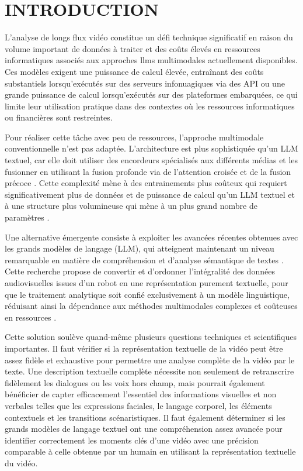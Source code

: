 \chapter{INTRODUCTION}

L’analyse de longs flux vidéo constitue un défi technique significatif en raison du volume important de données à traiter et des coûts élevés en ressources informatiques associés aux approches llms multimodales actuellement disponibles. Ces modèles exigent une puissance de calcul élevée, entraînant des coûts substantiels lorsqu’exécutés sur des serveurs infonuagiques via des API ou une grande puissance de calcul lorsqu’exécutés sur des plateformes embarquées, ce qui limite leur utilisation pratique dans des contextes où les ressources informatiques ou financières sont restreintes. 

Pour réaliser cette tâche avec peu de ressources, l'approche multimodale conventionnelle n’est pas adaptée. L’architecture est plus sophistiquée qu’un LLM textuel, car elle doit utiliser des encordeurs spécialisés aux différents médias et les fusionner en utilisant la fusion profonde via de l’attention croisée et de la fusion précoce \cite{wadekar2024_evolution_of_multimodal_model_architectures}. Cette complexité mène à des entrainements plus coûteux qui requiert significativement plus de données et de puissance de calcul qu’un LLM textuel et à une structure plus volumineuse qui mène à un plus grand nombre de paramètres \cite{liang2025_mixture_of_transformers}. 

Une alternative émergente consiste à exploiter les avancées récentes obtenues avec les grands modèles de langage (LLM), qui atteignent maintenant un niveau remarquable en matière de compréhension et d'analyse sémantique de textes \cite{zheng2023gptfathom}. Cette recherche propose de convertir et d’ordonner l'intégralité des données audiovisuelles issues d'un robot en une représentation purement textuelle, pour que le traitement analytique soit confié exclusivement à un modèle linguistique, réduisant ainsi la dépendance aux méthodes multimodales complexes et coûteuses en ressources \cite{liang2025_mixture_of_transformers}.

Cette solution soulève quand-même plusieurs questions techniques et scientifiques importantes. Il faut vérifier si la représentation textuelle de la vidéo peut être assez fidèle et exhaustive pour permettre une analyse complète de la vidéo par le texte. Une description textuelle complète nécessite non seulement de retranscrire fidèlement les dialogues ou les voix hors champ, mais pourrait également bénéficier de capter efficacement l’essentiel des informations visuelles et non verbales telles que les expressions faciales, le langage corporel, les éléments contextuels et les transitions scénaristiques. Il faut également déterminer si les grands modèles de langage textuel ont une compréhension assez avancée pour identifier correctement les moments clés d'une vidéo avec une précision comparable à celle obtenue par un humain en utilisant la représentation textuelle du vidéo. 


